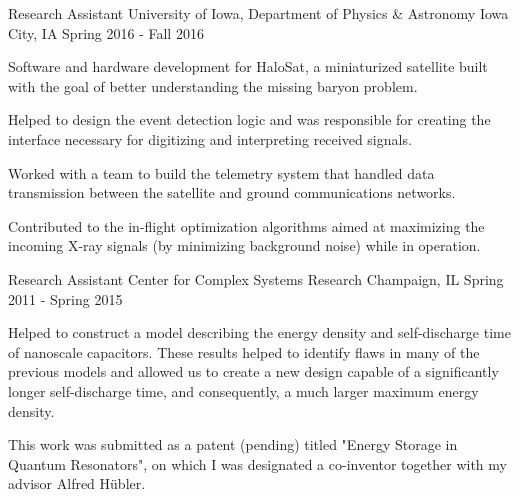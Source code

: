 
\begin{cventries}

  \cventry
  {Research Assistant} %
  {University of Iowa, Department of Physics \& Astronomy} %
  {Iowa City, IA} %
  {Spring 2016 - Fall 2016} %
  {
      \begin{cvitems} %
          \item {Software and hardware development for HaloSat, a miniaturized
                  satellite built with the goal of better understanding the
                  missing baryon problem.}
          \item {Helped to design the event detection logic and was responsible
                  for creating the interface necessary for digitizing and
                  interpreting received signals.}
          \item {Worked with a team to build the telemetry system that handled
                  data transmission between the satellite and ground
                  communications networks.}
          \item {Contributed to the in-flight optimization algorithms aimed at
                  maximizing the incoming X-ray signals (by minimizing
                  background noise) while in operation.}
      \end{cvitems}
  }

  \cventry
  {Research Assistant} %
  {Center for Complex Systems Research} %
  {Champaign, IL}
  {Spring 2011 - Spring 2015}
  {
      \begin{cvitems} 
          \item {Helped to construct a model describing the energy density and
                  self-discharge time of nanoscale capacitors. These results
                  helped to identify flaws in many of the previous models and
                  allowed us to create a new design capable of a significantly
                  longer self-discharge time, and consequently, a much larger
                  maximum energy density.} 
          \item {This work was submitted as a patent (pending) titled "Energy
                  Storage in Quantum Resonators", on which I was designated a
                  co-inventor together with my advisor Alfred H\"ubler.}
      \end{cvitems}
  }

\end{cventries}
